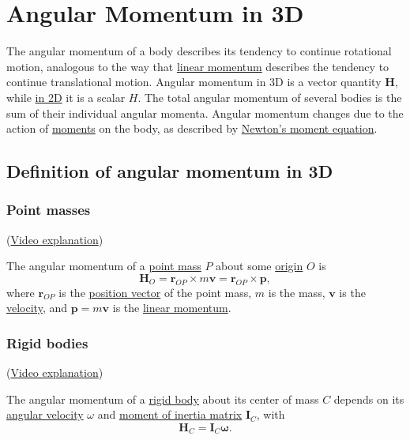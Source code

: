 \documentclass{article}
\renewcommand{\vec}[1]{\boldsymbol{#1}}
\renewcommand{\matrix}[1]{\boldsymbol{#1}}
\begin{document}
\section{Angular Momentum in 3D}

The angular momentum of a body describes its tendency to continue
rotational motion, analogous to the way that
\href{linear_momentum}{linear momentum} describes the tendency to
continue translational motion. Angular momentum in 3D is a vector
quantity $\vec{H}$, while \href{angular_momentum_2d}{in 2D} it is a
scalar $H$. The total angular momentum of several bodies is the sum of
their individual angular momenta. Angular momentum changes due to the
action of \href{moment}{moments} on the body, as described by
\href{newtons_eqn_moment}{Newton's moment equation}.

\subsection{Definition of angular momentum in 3D}

\subsubsection{Point masses}

(\href{angular_momentum_point_masses_video}{Video explanation})

The angular momentum of a \href{point_mass}{point mass} $P$ about some
\href{origin}{origin} $O$ is
\begin{equation}
  \label{eqn:ang_mom_3d_point_mass}
  \vec{H}_O = \vec{r}_{OP} \times m \vec{v} = \vec{r}_{OP} \times \vec{p},
\end{equation}
where $\vec{r}_{OP}$ is the \href{position_vector}{position vector} of
the point mass, $m$ is the mass, $\vec{v}$ is the
\href{velocity}{velocity}, and $\vec{p} = m \vec{v}$ is the
\href{linear_momentum}{linear momentum}.

\subsubsection{Rigid bodies}

(\href{angular_momentum_rigid_bodies_video}{Video explanation})

The angular momentum of a \href{rigid_body}{rigid body} about its
center of mass $C$ depends on its \href{angular_velocity}{angular
  velocity} $\omega$ and \href{moment_of_inertia_matrix}{moment of
  inertia matrix} $\matrix{I}_C$, with
\begin{equation}
  \label{eqn:ang_mom_3d_rigid_body}
  \vec{H}_C = \matrix{I}_C \vec{\omega}.
\end{equation}
\end{document}

